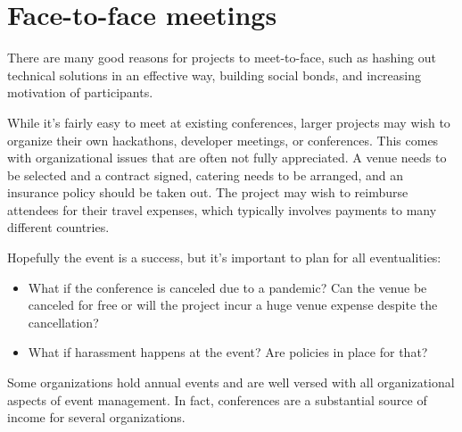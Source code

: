 


\chapter{Face-to-face meetings}

There are many good reasons for projects to meet-to-face, such as hashing out technical solutions in an effective way, building social bonds, and increasing motivation of participants.

While it's fairly easy to meet at existing conferences, larger projects may wish to organize their own hackathons, developer meetings, or conferences.  This comes with organizational issues that are often not fully appreciated.  A venue needs to be selected and a contract signed, catering needs to be arranged, and an insurance policy should be taken out.  The project may wish to reimburse attendees for their travel expenses, which typically involves payments to many different countries.

Hopefully the event is a success, but it's important to plan for all eventualities:

\begin{itemize}

\item What if the conference is canceled due to a pandemic? Can the venue be canceled for free or will the project incur a huge venue expense despite the cancellation?
\item What if harassment happens at the event?  Are policies in place for that?

\end{itemize}

Some organizations hold annual events and are well versed with all organizational aspects of event management.  In fact, conferences are a substantial source of income for several organizations.

